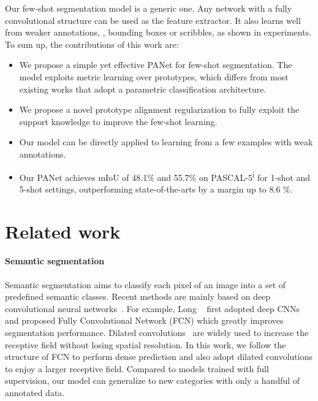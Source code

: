 \documentclass[10pt,twocolumn,letterpaper]{article}
\begin{document}
Our few-shot segmentation model is a generic one. Any network with a fully convolutional structure can be used as the feature extractor. It also learns well from weaker annotations, \eg, bounding boxes or scribbles, as shown in experiments.  To sum up, the contributions of this work are:
\vspace{-15pt}
\begin{itemize}
\setlength\itemsep{0em}
    \item We propose a simple yet effective PANet for few-shot segmentation. The model exploits metric learning over prototypes, which differs from most existing works that adopt a parametric classification architecture.
    \vspace{-2pt}
    \item We propose a novel prototype alignment regularization to fully exploit the support knowledge to improve the few-shot learning.
    \vspace{-2pt}
    \item Our model can be directly applied  to learning from a few examples with  weak annotations.
    \vspace{-2pt}
    \item Our PANet  achieves  mIoU  of 48.1\% and 55.7\% on PASCAL-5\textsuperscript{i} for  1-shot and 5-shot settings, outperforming state-of-the-arts by a  margin up to 8.6 \%.
\end{itemize}



\section{Related work}
\paragraph{Semantic segmentation} 
Semantic segmentation aims to classify each pixel of an image into a set of predefined semantic classes. Recent methods are mainly based on deep convolutional neural networks~\cite{long2015fully, lin2017refinenet, badrinarayanan2017segnet, zhao2017pyramid, chen2018deeplab}. For example, Long \etal~\cite{long2015fully} first adopted deep CNNs and proposed Fully Convolutional Network (FCN) which greatly improves segmentation performance. Dilated convolutions~\cite{yu2015multi, chen2018deeplab} are widely used to increase the receptive field without losing spatial resolution. In this work, we follow the structure of FCN to perform dense prediction and also adopt dilated convolutions to enjoy a larger receptive field. Compared to models trained with full supervision, our model can generalize to new categories with only a handful of annotated data.
\end{document}

